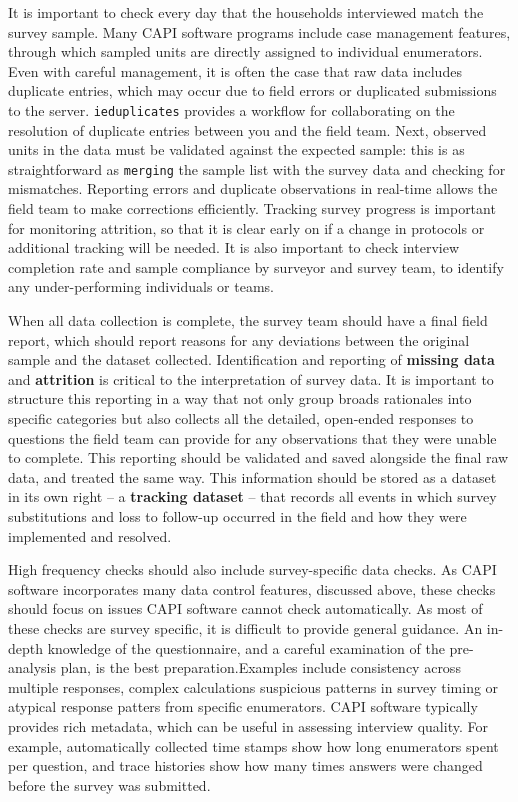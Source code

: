 {It is important to check every day that the households interviewed match the survey sample. 
Many CAPI software programs include case management features, through which sampled units are directly assigned to individual enumerators. 
Even with careful management, it is often the case that raw data includes duplicate entries, which may occur due to field errors or duplicated submissions to the server. 
\texttt{ieduplicates}
provides a workflow for collaborating on the resolution of duplicate entries between you and the field team.
Next, observed units in the data must be validated against the expected sample:
this is as straightforward as \texttt{merging} the sample list with the survey data and checking for mismatches.
Reporting errors and duplicate observations in real-time allows the field team to make corrections efficiently.
Tracking survey progress is important for monitoring attrition, so that it is clear early on if a change in protocols or additional tracking will be needed. 
It is also important to check interview completion rate and sample compliance by surveyor and survey team, to identify any under-performing individuals or teams. 

When all data collection is complete, the survey team should have a final field report, which should report reasons for any deviations between the original sample and the dataset collected.
Identification and reporting of \textbf{missing data} and \textbf{attrition} is critical to the interpretation of survey data.
It is important to structure this reporting in a way that not only group broads rationales into specific categories
but also collects all the detailed, open-ended responses to questions the field team can provide for any observations that they were unable to complete.
This reporting should be validated and saved alongside the final raw data, and treated the same way.
This information should be stored as a dataset in its own right -- a \textbf{tracking dataset} -- that records all events in which survey substitutions
and loss to follow-up occurred in the field and how they were implemented and resolved.

High frequency checks should also include survey-specific data checks. As CAPI software incorporates many data control features, discussed above, these checks should focus on issues CAPI software cannot check automatically. As most of these checks are survey specific, it is difficult to provide general guidance. An in-depth knowledge of the questionnaire, and a careful examination of the pre-analysis plan, is the best preparation.Examples include  consistency across multiple responses, complex calculations suspicious patterns in survey timing or atypical response patters from specific enumerators.  CAPI software typically provides rich metadata, which can be useful in assessing interview quality. For example, automatically collected time stamps show how long enumerators spent per question, and trace histories show how many times answers were changed before the survey was submitted. 


}

